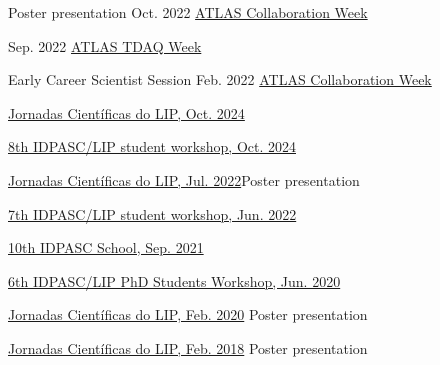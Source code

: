 \begin{cventries}
    {Poster presentation}
    {Oct. 2022}
    {\href{https://indico.cern.ch/event/1187086/\#37-the-atlas-jet-trigger-in-ru}{ATLAS Collaboration Week}}
    {}\vspace*{2mm}

    {}
    {Sep. 2022}
    {\href{https://indico.cern.ch/event/1172448/contributions/4924082/}{ATLAS TDAQ Week}}
    {}\vspace*{2mm}

    {Early Career Scientist Session}
    {Feb. 2022}
    {\href{https://indico.cern.ch/event/1108354/\#167-readiness-of-the-jet-trigg}{ATLAS Collaboration Week}}{}


    {\href{https://indico.lip.pt/event/1744/}{Jornadas Científicas do LIP, Oct. 2024}}{}

    {\href{https://indico.lip.pt/event/1745/}{8th IDPASC/LIP student workshop, Oct. 2024}}{}

    {\href{https://indico.lip.pt/event/1183/}{Jornadas Científicas do LIP, Jul. 2022}}{Poster presentation}

    {\href{https://indico.lip.pt/event/1245/}{7th IDPASC/LIP student workshop, Jun. 2022}}{}
    
    {}{\href{https://indico.lip.pt/event/643}{10th IDPASC School, Sep. 2021}}{}

    {}{\href{https://indico.lip.pt/event/699/}{6th IDPASC/LIP PhD Students Workshop, Jun. 2020}}
    {}

    {}{\href{https://indico.lip.pt/event/650/}{Jornadas Científicas do LIP, Feb. 2020}}
    {Poster presentation}

    {}{\href{https://indico.lip.pt/event/359/}{Jornadas Científicas do LIP, Feb. 2018}}
    {Poster presentation}    

\end{cventries}